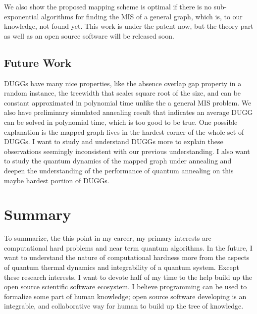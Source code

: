 \documentclass[a4paper]{article}
\newcommand{\<}{\langle}
\renewcommand{\>}{\rangle}
\begin{document}
We also show the proposed mapping scheme is optimal if there is no sub-exponential algorithms for finding the MIS of a general graph, which is, to our knowledge, not found yet.
This work is under the patent now, but the theory part as well as an open source software will be released soon.

\subsection{Future Work}
DUGGs have many nice properties, like the absence overlap gap property in a random instance, the treewidth that scales square root of the size, and can be constant approximated in polynomial time unlike the a general MIS problem.
We also have preliminary simulated annealing result that indicates an average DUGG can be solved in polynomial time, which is too good to be true.
One possible explanation is the mapped graph lives in the hardest corner of the whole set of DUGGs.
I want to study and understand DUGGs more to explain these observations seemingly inconsistent with our previous understanding.
I also want to study the quantum dynamics of the mapped graph under annealing and deepen the understanding of the performance of quantum annealing on this maybe hardest portion of DUGGs.

\section{Summary}
To summarize, the this point in my career, my primary interests are computational hard problems and near term quantum algorithms.
In the future, I want to understand the nature of computational hardness more from the aspects of quantum thermal dynamics and integrability of a quantum system.
Except these research interests, I want to devote half of my time to the help build up the open source scientific software ecosystem.
I believe programming can be used to formalize some part of human knowledge; open source software developing is an integrable, and collaborative way for human to build up the tree of knowledge.


\end{document}
